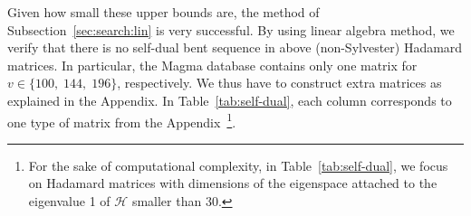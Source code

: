 \documentclass[12pt]{article}
\begin{document}
Given how small these upper bounds are, the method of Subsection~\ref{sec:search:lin} is very successful. By using linear algebra method, we verify that there is no self-dual bent sequence in above (non-Sylvester) Hadamard matrices. In particular, the Magma database contains only one matrix for $v\in\{100,\; 144,\; 196\}$, respectively. We thus have to construct extra matrices as explained in the Appendix.
In Table~\ref{tab:self-dual}, each column corresponds to one type of matrix from the Appendix~\footnote{For the sake of computational complexity, in Table~\ref{tab:self-dual}, we focus on Hadamard matrices with dimensions of the eigenspace attached to the eigenvalue 1 of $\mathcal{H}$ smaller than 30.}.
\end{document}
